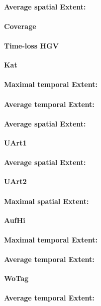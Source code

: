 \paragraph{Average spatial Extent:}
\paragraph{Coverage}
\paragraph{Time-loss HGV}

\large
\centerline{\textbf{Kat}}
\normalsize

\paragraph{Maximal temporal Extent:}
\paragraph{Average temporal Extent:}
\paragraph{Average spatial Extent:}

\large
\centerline{\textbf{UArt1}}
\normalsize

\paragraph{Average spatial Extent:}

\large
\centerline{\textbf{UArt2}}
\normalsize

\paragraph{Maximal spatial Extent:}

\large
\centerline{\textbf{AufHi}}
\normalsize

\paragraph{Maximal temporal Extent:}
\paragraph{Average temporal Extent:}


\large
\centerline{\textbf{WoTag}}
\normalsize

\paragraph{Average temporal Extent:}

